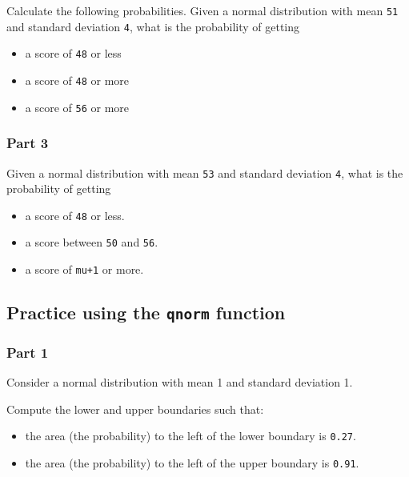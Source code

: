 \documentclass[12pt,]{krantz}
\providecommand{\tightlist}{%
  \setlength{\itemsep}{0pt}\setlength{\parskip}{0pt}}
\theoremstyle{definition}
\theoremstyle{definition}
\theoremstyle{definition}
\theoremstyle{remark}
\begin{document}
Calculate the following probabilities.
Given a normal distribution with mean \texttt{51} and standard deviation \texttt{4}, what is the probability of getting

\begin{itemize}
\tightlist
\item
  a score of \texttt{48} or less
\item
  a score of \texttt{48} or more
\item
  a score of \texttt{56} or more
\end{itemize}

\hypertarget{part-3}{%
\subsubsection{Part 3}\label{part-3}}

Given a normal distribution with mean \texttt{53} and standard deviation \texttt{4}, what is the probability of getting

\begin{itemize}
\tightlist
\item
  a score of \texttt{48} or less.
\item
  a score between \texttt{50} and \texttt{56}.
\item
  a score of \texttt{mu+1} or more.
\end{itemize}

\hypertarget{practice-using-the-qnorm-function}{%
\subsection{\texorpdfstring{Practice using the \texttt{qnorm} function}{Practice using the qnorm function}}\label{practice-using-the-qnorm-function}}

\hypertarget{part-1-1}{%
\subsubsection{Part 1}\label{part-1-1}}

Consider a normal distribution with mean 1 and standard deviation 1.

Compute the lower and upper boundaries such that:

\begin{itemize}
\tightlist
\item
  the area (the probability) to the left of the lower boundary is \texttt{0.27}.
\item
  the area (the probability) to the left of the upper boundary is \texttt{0.91}.
\end{itemize}
\end{document}
